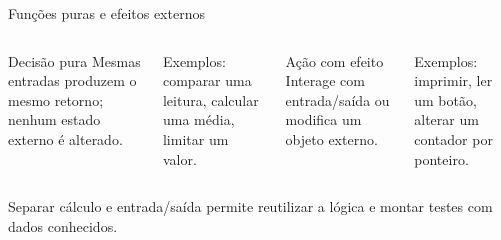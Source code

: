 \begin{frame}{Funções puras e efeitos externos}
\begin{columns}[T]
\begin{block}{Decisão pura}
Mesmas entradas produzem o mesmo retorno; nenhum estado externo é alterado.
\end{block}
\small Exemplos: comparar uma leitura, calcular uma média, limitar um valor.
\begin{block}{Ação com efeito}
Interage com entrada/saída ou modifica um objeto externo.
\end{block}
\small Exemplos: imprimir, ler um botão, alterar um contador por ponteiro.
\end{columns}
\vspace{0.4cm}
Separar cálculo e entrada/saída permite reutilizar a lógica e montar testes com dados conhecidos.
\end{frame}
